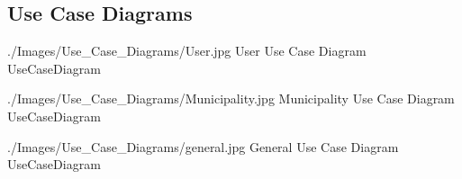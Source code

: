 \documentclass[../../../rasd.tex]{subfiles}
\begin{document}
\subsection{Use Case Diagrams\label{sect:3.2.2}}

\image {9cm} {./Images/Use_Case_Diagrams/User.jpg} {User Use Case Diagram} {UseCaseDiagram}

\image {7cm} {./Images/Use_Case_Diagrams/Municipality.jpg} {Municipality Use Case Diagram} {UseCaseDiagram}

\image {13cm} {./Images/Use_Case_Diagrams/general.jpg} {General Use Case Diagram} {UseCaseDiagram}

\newpage
\end{document}
